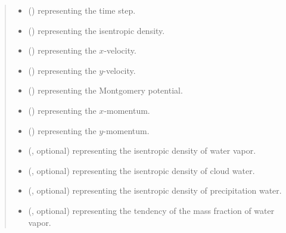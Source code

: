 \documentclass[letterpaper,10pt,english]{sphinxmanual}
\begin{document}
\begin{fulllineitems}
\begin{fulllineitems}
\begin{quote}
\begin{description}
\begin{itemize}
\item {} 
 () \textendash{}  representing the time step.

\item {} 
 () \textendash{}  representing the isentropic density.

\item {} 
 () \textendash{}  representing the \(x\)-velocity.

\item {} 
 () \textendash{}  representing the \(y\)-velocity.

\item {} 
 () \textendash{}  representing the Montgomery potential.

\item {} 
 () \textendash{}  representing the \(x\)-momentum.

\item {} 
 () \textendash{}  representing the \(y\)-momentum.

\item {} 
 (, optional) \textendash{}  representing the isentropic density of water vapor.

\item {} 
 (, optional) \textendash{}  representing the isentropic density of cloud water.

\item {} 
 (, optional) \textendash{}  representing the isentropic density of precipitation water.

\item {} 
 (, optional) \textendash{}  representing the tendency of the mass fraction of water vapor.


\end{itemize}
\end{description}
\end{quote}
\end{fulllineitems}
\end{fulllineitems}
\end{document}
